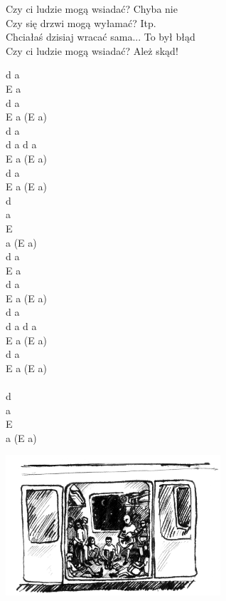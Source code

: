 \documentclass[a5paper, 10pt]{book}
\begin{document}
\begin{minipage}[t]{0.8\textwidth}
  \hspace*{7mm}Czy ci ludzie mogą wsiadać? Chyba nie\\
  \hspace*{7mm}Czy się drzwi mogą wyłamać? Itp.\\
  \hspace*{7mm}Chciałaś dzisiaj wracać sama... To był błąd\\
  \hspace*{7mm}Czy ci ludzie mogą wsiadać? Ależ skąd!\\
\end{minipage}
\begin{minipage}[t]{0.2\textwidth}
  d a\\
  E a\\
  d a\\
  E a (E a)\vspace*{1.5mm}\\
  d a\\
  d a d a\\
  E a (E a)\\
  d a\\
  E a (E a)\\

  d\\
  a\\
  E\\
  a (E a)\\

  d a\\
  E a\\
  d a\\
  E a (E a)\vspace*{1.5mm}\\
  d a\\
  d a d a\\
  E a (E a)\\
  d a\\
  E a (E a)\\
  \\
  d\\
  a\\
  E\\
  a (E a)\\
\end{minipage}
\includegraphics[height=5.2cm, center]{images/czy_ci_ludzie.png}
\end{document}
